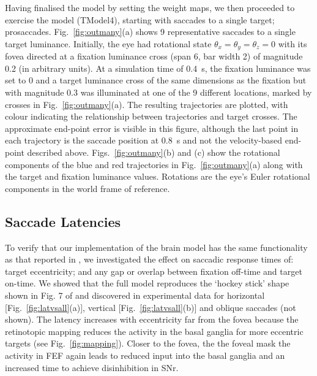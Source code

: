 \documentclass{frontiersSCNS}
\begin{document}
Having finalised the model by setting the weight maps, we then
proceeded to exercise the model (TModel4), starting with saccades to a
single target; prosaccades. Fig.~\ref{fig:outmany}(a) shows 9
representative saccades to a single target luminance. Initially, the
eye had rotational state $\theta_x=\theta_y=\theta_z=0$ with its fovea
directed at a fixation luminance cross (span 6\dg, bar width 2\dg) of
magnitude 0.2 (in arbitrary units). At a simulation time of 0.4~s, the
fixation luminance was set to 0 and a target luminance cross of the
same dimensions as the fixation but with magnitude 0.3 was illuminated
at one of the 9 different locations, marked by crosses in
Fig.~\ref{fig:outmany}(a).  The resulting trajectories are plotted, with
colour indicating the relationship between trajectories and target
crosses. The approximate end-point error is visible in this figure,
although the last point in each trajectory is the saccade position at
0.8~s and not the velocity-based end-point described
above. Figs.~\ref{fig:outmany}(b) and (c) show the rotational components
of the blue and red trajectories in Fig.~\ref{fig:outmany}(a) along with
the target and fixation luminance values. Rotations are the eye's
Euler rotational components in the world frame of reference.


\subsection{Saccade Latencies} \label{sec:results:latencies}

To verify that our implementation of the brain model has the same
functionality as that reported in \cite{cope_basal_2017}, we
investigated the effect on saccadic response times of: target
eccentricity; and any gap or overlap between fixation off-time and
target on-time. We showed that the full model reproduces the `hockey
stick' shape shown in Fig. 7 of \cite{cope_basal_2017} and discovered in
experimental data \citep{reulen_latency_1984} for horizontal
[Fig.~\ref{fig:latvsall}(a)], vertical [Fig.~\ref{fig:latvsall}(b)] and
oblique saccades (not shown). The latency increases with eccentricity
far from the fovea because the retinotopic mapping reduces the
activity in the basal ganglia for more eccentric targets (see
Fig.~\ref{fig:mapping}). Closer to the fovea, the  the
foveal mask  the activity in FEF again leads to reduced input
into the basal ganglia and an increased time to achieve disinhibition
in SNr.
\end{document}
